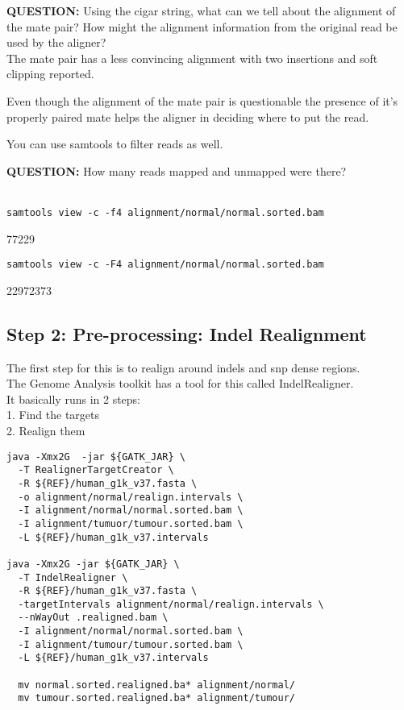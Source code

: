 \textbf{QUESTION:} Using the cigar string, what can we tell about the alignment of the mate pair? How might the alignment information from the original read be used by the aligner?\\
The mate pair has a less convincing alignment with two insertions and soft clipping reported.

Even though the alignment of the mate pair is questionable the presence of it's properly paired mate helps the aligner in deciding where to put the read. 

You can use samtools to filter reads as well.

\textbf{QUESTION:} How many reads mapped and unmapped were there? \\
[HINT: Look at the samtools view help menu by typing samtools view without any arguments] \\
\begin{lstlisting}
samtools view -c -f4 alignment/normal/normal.sorted.bam
\end{lstlisting}
77229 \\

\begin{lstlisting}
samtools view -c -F4 alignment/normal/normal.sorted.bam
\end{lstlisting}
22972373 \\

\subsection{Step 2: Pre-processing: Indel Realignment}
The first step for this is to realign around indels and snp dense regions.\\
The Genome Analysis toolkit has a tool for this called IndelRealigner. \\
It basically runs in 2 steps: \\
   1. Find the targets \\
   2. Realign them \\

\begin{lstlisting}
java -Xmx2G  -jar ${GATK_JAR} \
  -T RealignerTargetCreator \
  -R ${REF}/human_g1k_v37.fasta \
  -o alignment/normal/realign.intervals \
  -I alignment/normal/normal.sorted.bam \
  -I alignment/tumuor/tumour.sorted.bam \
  -L ${REF}/human_g1k_v37.intervals

java -Xmx2G -jar ${GATK_JAR} \
  -T IndelRealigner \
  -R ${REF}/human_g1k_v37.fasta \
  -targetIntervals alignment/normal/realign.intervals \
  --nWayOut .realigned.bam \
  -I alignment/normal/normal.sorted.bam \
  -I alignment/tumour/tumour.sorted.bam \
  -L ${REF}/human_g1k_v37.intervals

  mv normal.sorted.realigned.ba* alignment/normal/
  mv tumour.sorted.realigned.ba* alignment/tumour/
\end{lstlisting}


